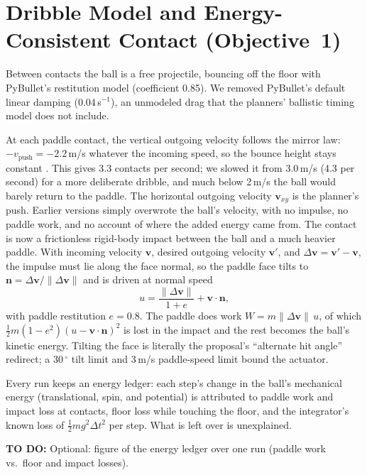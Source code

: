 \documentclass[10pt,twocolumn]{article}
\newcommand{\gap}[1]{\par\noindent\colorbox{yellow!40}{\parbox{\dimexpr\linewidth-2\fboxsep}{\small\textbf{TO DO:} #1}}\par}
\begin{document}
\section{Dribble Model and Energy-Consistent Contact (Objective~1)}
\label{sec:energy}
Between contacts the ball is a free projectile, bouncing off the floor
with PyBullet's restitution model (coefficient 0.85). We removed
PyBullet's default linear damping (0.04\,s$^{-1}$), an unmodeled drag that
the planners' ballistic timing model does not include.

At each paddle contact, the vertical outgoing velocity follows the mirror
law: $-v_{\text{push}} = -2.2$\,m/s whatever the incoming speed, so the
bounce height stays constant \cite{buehler1994}. This gives 3.3 contacts
per second; we slowed it from 3.0\,m/s (4.3 per second) for a more
deliberate dribble, and much below 2\,m/s the ball would barely return to
the paddle. The horizontal outgoing velocity $\mathbf{v}_{xy}$ is the
planner's push. Earlier versions simply overwrote the ball's velocity,
with no impulse, no paddle work, and no account of where the added energy
came from. The contact is now a frictionless rigid-body impact between the
ball and a much heavier paddle. With incoming velocity $\mathbf{v}$,
desired outgoing velocity $\mathbf{v}'$, and $\Delta\mathbf{v} =
\mathbf{v}' - \mathbf{v}$, the impulse must lie along the face normal, so
the paddle face tilts to $\mathbf{n} = \Delta\mathbf{v}/\|\Delta\mathbf{v}\|$
and is driven at normal speed
\begin{equation}
u = \frac{\|\Delta\mathbf{v}\|}{1+e} + \mathbf{v}\cdot\mathbf{n},
\end{equation}
with paddle restitution $e = 0.8$. The paddle does work
$W = m\|\Delta\mathbf{v}\|\,u$, of which
$\tfrac12 m(1-e^2)(u - \mathbf{v}\cdot\mathbf{n})^2$ is lost in the impact and
the rest becomes the ball's kinetic energy. Tilting the face is literally
the proposal's ``alternate hit angle'' redirect; a 30\,$^\circ$ tilt limit and
3\,m/s paddle-speed limit bound the actuator.

Every run keeps an energy ledger: each step's change in the ball's
mechanical energy (translational, spin, and potential) is attributed to
paddle work and impact loss at contacts, floor loss while touching the
floor, and the integrator's known loss of $\tfrac12 m g^2 \Delta t^2$ per
step. What is left over is unexplained.

\gap{Optional: figure of the energy ledger over one run (paddle work vs.\
floor and impact losses).}
\end{document}
